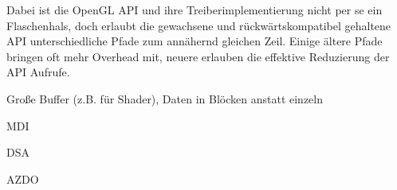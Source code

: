 Dabei ist die OpenGL API und ihre Treiberimplementierung nicht per se ein Flaschenhals, doch erlaubt die gewachsene und rückwärtskompatibel gehaltene API unterschiedliche Pfade zum annähernd gleichen Zeil. Einige ältere Pfade bringen oft mehr Overhead mit, neuere erlauben die effektive Reduzierung der API Aufrufe.

Große Buffer (z.B. für Shader), Daten in Blöcken anstatt einzeln
\cite{Everitt2014}

\ac{MDI}

\ac{DSA}

\ac{AZDO}

\cite{gamedevnet:glnext}
